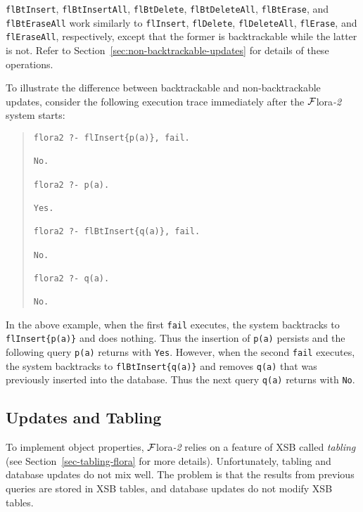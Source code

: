\documentclass[11pt]{article}
\newcommand{\FLORA}{{\mbox{${\cal F}${\sc lora}\rm\emph{-2}}}\xspace}
\begin{document}
{\tt flBtInsert}, {\tt flBtInsertAll}, {\tt flBtDelete}, {\tt flBtDeleteAll},
{\tt flBtErase}, and {\tt flBtEraseAll} work similarly to {\tt flInsert},
{\tt flDelete}, {\tt flDeleteAll}, {\tt flErase}, and {\tt flEraseAll},
respectively, except that the former is backtrackable while the latter
is not. Refer to Section~\ref{sec:non-backtrackable-updates} for
details of these operations.

To illustrate the difference between backtrackable and
non-backtrackable updates, consider the following execution trace
immediately after the \FLORA system starts:
\begin{quote}
\begin{verbatim}
flora2 ?- flInsert{p(a)}, fail.

No.

flora2 ?- p(a).

Yes.

flora2 ?- flBtInsert{q(a)}, fail.

No.

flora2 ?- q(a).

No.
\end{verbatim}
\end{quote}
In the above example, when the first \verb|fail| executes, the system
backtracks to {\tt flInsert\{p(a)\}} and does nothing. Thus the insertion
of {\tt p(a)} persists and the following query \verb|p(a)| returns
with {\tt Yes}. However, when the second \verb|fail| executes, the
system backtracks to {\tt flBtInsert\{q(a)\}} and removes {\tt q(a)} that
was previously inserted into the database. Thus the next query
\verb|q(a)| returns with {\tt No}.


\subsection{Updates and Tabling}


To implement object properties, \FLORA relies on a feature of XSB called
\emph{tabling} (see Section~\ref{sec-tabling-flora} for more details).
Unfortunately, tabling and database updates do not mix well.
The problem is that the results from previous queries are stored in
XSB tables, and database updates do not modify XSB tables.
\end{document}
